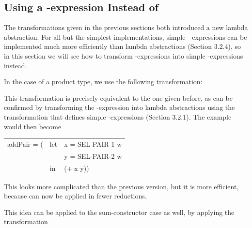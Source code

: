 {\subsection{Using a -expression Instead of }
The transformations given in the previous sections both introduced a new
lambda abstraction. For all but the simplest implementations, simple -
expressions can be implemented much more efficiently than lambda
abstractions (Section 3.2.4), so in this section we will see how to transform
-expressions into simple -expressions instead.

In the case of a product type, we use the following transformation:


\noindent
This transformation is precisely equivalent to the one given before, as can be
confirmed by transforming the -expression into lambda abstractions using
the transformation that defines simple -expressions (Section 3.2.1). The
 example would then become
\begin{mlcoded}
    \begin{tabular}{lll}
    addPair = \tlb{w}(&let &x = SEL-PAIR-1 w \\
        &    &y = SEL-PAIR-2 w \\
        &in &(+ x y))
    \end{tabular}
\end{mlcoded}
This looks more complicated than the previous version, but it is more
efficient, because  can now be applied in fewer reductions.

This idea can be applied to the sum-constructor case as well, by applying the
transformation

}
